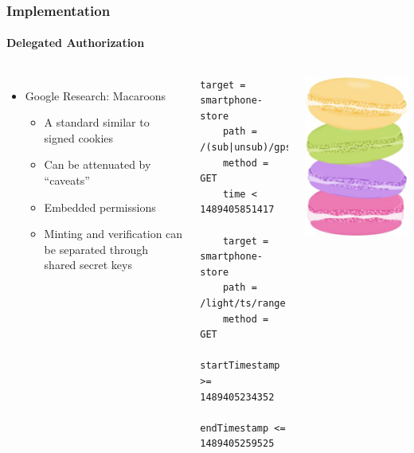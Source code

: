\documentclass[aspectratio=169]{beamer}
\begin{document}
\begin{frame}[fragile]
	\frametitle{Implementation}
	\framesubtitle{Delegated Authorization}
	\begin{columns}[c]
		\begin{itemize}
			\item Google Research: Macaroons
			\begin{itemize}
				\item A standard similar to signed cookies
				\item Can be attenuated by ``caveats''
				\item Embedded permissions
				\item Minting and verification can be separated through shared secret keys
			\end{itemize}
		\end{itemize}
		\begin{lstlisting}[language=caveats]
    target = smartphone-store
    path = /(sub|unsub)/gps/*
    method = GET
    time < 1489405851417

    target = smartphone-store
    path = /light/ts/range
    method = GET
    startTimestamp >= 1489405234352
    endTimestamp <= 1489405259525
		\end{lstlisting}
		\centering
		\includegraphics[height=\textwidth]{macaroons}
	\end{columns}
\end{frame}
\end{document}
